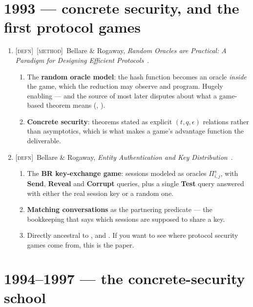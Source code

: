\documentclass[11pt]{article}
\newcommand{\kind}[1]{{\footnotesize\textsc{\textcolor{yearcolor}{[#1]}}}\ }
\newcommand{\defn}{\kind{defn}}
\newcommand{\method}{\kind{method}}
\newcommand{\paper}[3]{#1, \emph{#2}~\cite{#3}.}
\begin{document}
\section{1993 --- concrete security, and the first protocol games}

\begin{enumerate}
  \item \defn\method \paper{Bellare \& Rogaway}{Random Oracles are Practical: A
    Paradigm for Designing Efficient Protocols}{BR93rom}
    \begin{enumerate}
      \item The \textbf{random oracle model}: the hash function becomes an
        oracle \emph{inside} the game, which the reduction may observe and
        program. Hugely enabling --- and the source of most later disputes
        about what a game-based theorem means (\cite{CGH04}, \cite{BHK13}).
      \item \textbf{Concrete security}: theorems stated as explicit
        $(t, q, \epsilon)$ relations rather than asymptotics, which is what
        makes a game's advantage function the deliverable.
    \end{enumerate}

  \item \defn \paper{Bellare \& Rogaway}{Entity Authentication and Key
    Distribution}{BR93ke}
    \begin{enumerate}
      \item The \textbf{BR key-exchange game}: sessions modeled as oracles
        $\Pi_{i,j}^s$, with \textbf{Send}, \textbf{Reveal} and \textbf{Corrupt}
        queries, plus a single \textbf{Test} query answered with either the real
        session key or a random one.
      \item \textbf{Matching conversations} as the partnering predicate --- the
        bookkeeping that says which sessions are supposed to share a key.
      \item Directly ancestral to \cite{CK01}, \cite{JKSS12} and \cite{FG14}.
        If you want to see where protocol security games come from, this is the
        paper.
    \end{enumerate}
\end{enumerate}

\section{1994--1997 --- the concrete-security school}
\end{document}
